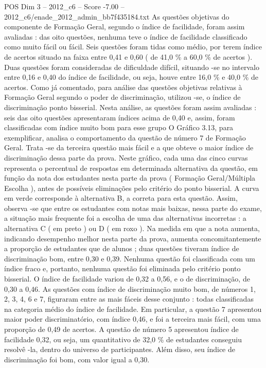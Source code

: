 \begin{textsample}{POS Dim 3 – 2012\_c6 – Score -7.00 – 2012\_c6/enade\_2012\_admin\_bb7f435184.txt}
As questões objetivas do componente de Formação Geral, segundo o índice de facilidade, foram assim avaliadas : das oito questões, nenhuma teve o índice de facilidade classificado como muito fácil ou fácil.
Seis questões foram tidas como médio, por terem índice de acertos situado na faixa entre 0,41 e 0,60 ( de 41,0 \% a 60,0 \% de acertos ).
Duas questões foram consideradas de dificuldade difícil, situando -se no intervalo entre 0,16 e 0,40 do índice de facilidade, ou seja, houve entre 16,0 \% e 40,0 \% de acertos.
Como já comentado, para análise das questões objetivas relativas à Formação Geral segundo o poder de discriminação, utilizou -se, o índice de discriminação ponto bisserial.
Nesta análise, as questões foram assim avaliadas : seis das oito questões apresentaram índices acima de 0,40 e, assim, foram classificadas com índice muito bom para esse grupo O Gráfico 3.13, para exemplificar, analisa o comportamento da questão de número 7 de Formação Geral.
Trata -se da terceira questão mais fácil e a que obteve o maior índice de discriminação dessa parte da prova.
Neste gráfico, cada uma das cinco curvas representa o percentual de respostas em determinada alternativa da questão, em função da nota dos estudantes nesta parte da prova ( Formação Geral/Múltipla Escolha ), antes de possíveis eliminações pelo critério do ponto bisserial.
A curva em verde corresponde à alternativa B, a correta para esta questão.
Assim, observa -se que entre os estudantes com notas mais baixas, nessa parte do exame, a situação mais frequente foi a escolha de uma das alternativas incorretas : a alternativa C ( em preto ) ou D ( em roxo ).
Na medida em que a nota aumenta, indicando desempenho melhor nesta parte da prova, aumenta concomitantemente a proporção de estudantes que de alunos ; duas questões tiveram índice de discriminação bom, entre 0,30 e 0,39.
Nenhuma questão foi classificada com um índice fraco e, portanto, nenhuma questão foi eliminada pelo critério ponto bisserial.
O índice de facilidade variou de 0,32 a 0,56, e o de discriminação, de 0,30 a 0,46.
As questões com índice de discriminação muito bom, de números 1, 2, 3, 4, 6 e 7, figuraram entre as mais fáceis desse conjunto : todas classificadas na categoria médio do índice de facilidade.
Em particular, a questão 7 apresentou maior poder discriminatório, com índice 0,46, e foi a terceira mais fácil, com uma proporção de 0,49 de acertos.
A questão de número 5 apresentou índice de facilidade 0,32, ou seja, um quantitativo de 32,0 \% de estudantes conseguiu resolvê -la, dentro do universo de participantes.
Além disso, seu índice de discriminação foi bom, com valor igual a 0,30.

\end{textsample}
